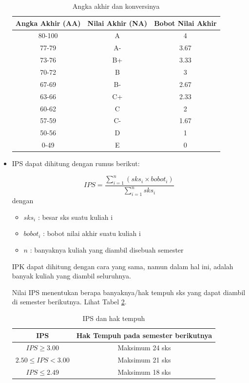 \begin{itemize}
		\begin{table}[H]
			\centering
			\caption{Angka akhir dan konversinya}
				\begin{tabular}{|c|c|c|}
					\hline
					Angka Akhir (AA) & Nilai Akhir (NA) & Bobot Nilai Akhir \\ \hline
					80-100         & A                & 4                 \\ \hline
					77-79          & A-               & 3.67              \\ \hline
					73-76          & B+               & 3.33              \\ \hline
					70-72          & B                & 3                 \\ \hline
					67-69          & B-               & 2.67              \\ \hline
					63-66          & C+               & 2.33              \\ \hline
					60-62          & C                & 2                 \\ \hline
					57-59          & C-               & 1.67              \\ \hline
					50-56          & D                & 1                 \\ \hline
					0-49           & E                & 0                 \\ \hline
				\end{tabular}
			\label{tab:AngkaAkhirDanKonversinya}
		\end{table}
		
		\item IPS dapat dihitung dengan rumus berikut:
		
			\[IPS = \frac{\sum^{n}_{i=1} (sks_{i}\times bobot_{i})}{\sum^{n}_{i=1} sks_{i}}
		\]
		dengan
		\begin{itemize}
			\item $sks_{i}$ : besar sks suatu kuliah i
			\item $bobot_{i}$ : bobot nilai akhir suatu kuliah i
			\item $n$ : banyaknya kuliah yang diambil disebuah semester
		\end{itemize}
		IPK dapat dihitung dengan cara yang sama, namun dalam hal ini,   adalah banyak kuliah yang diambil seluruhnya.
		
		Nilai IPS menentukan berapa banyaknya/hak tempuh sks yang dapat diambil di semester berikutnya. Lihat Tabel \ref{tab:IpsDanHakTempuh}.
		
		\begin{table}[H]
			\centering
				\caption{IPS dan hak tempuh}
				\begin{tabular}{|c|c|}
					\hline
\textbf{IPS} & \textbf{Hak Tempuh pada semester berikutnya} \\ \hline
					$IPS \geq 3.00$ & Maksimum 24 sks \\ \hline
					$2.50 \leq IPS < 3.00$ & Maksimum 21 sks \\ \hline
					$IPS \leq 2.49$ & Maksimum 18 sks \\ \hline
				\end{tabular}
			\label{tab:IpsDanHakTempuh}
		\end{table}
\end{itemize}


